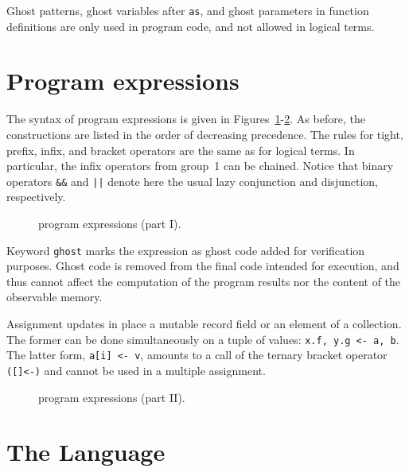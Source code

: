 Ghost patterns, ghost variables after \texttt{as},
and ghost parameters in function definitions are only used
in program code, and not allowed in logical terms.

\section{Program expressions}
\label{sec:exprs}

The syntax of program expressions is given in
Figures~\ref{fig:bnf:expr1}-\ref{fig:bnf:expr2}.
As before, the constructions are listed in the order of decreasing
precedence. The rules for tight, prefix, infix, and bracket operators
are the same as for logical terms. In particular, the infix operators
from group~1 can be chained. Notice that binary operators \texttt{\&\&}
and \texttt{||} denote here the usual lazy conjunction and disjunction,
respectively.

\begin{figure}[ht]
\begin{center}\end{center}
\caption{\whyml program expressions (part I).}
\label{fig:bnf:expr1}
\end{figure}

Keyword \texttt{ghost} marks the expression as
ghost code added for verification purposes. Ghost code is
removed from the final code intended for execution, and thus
cannot affect the computation of the program results nor the
content of the observable memory.

Assignment updates in place
a mutable record field or an element of a collection.
The former can be done simultaneously
on a tuple of values: \texttt{x.f, y.g <- a, b}. The latter
form, \texttt{a[i] <- v}, amounts to a call of the ternary
bracket operator \texttt{([]<-)} and cannot be used in a
multiple assignment.

\newpage
\begin{figure}[ht]
\begin{center}\end{center}
\caption{\whyml program expressions (part II).}
\label{fig:bnf:expr2}
\end{figure}



\section{The \why Language}

